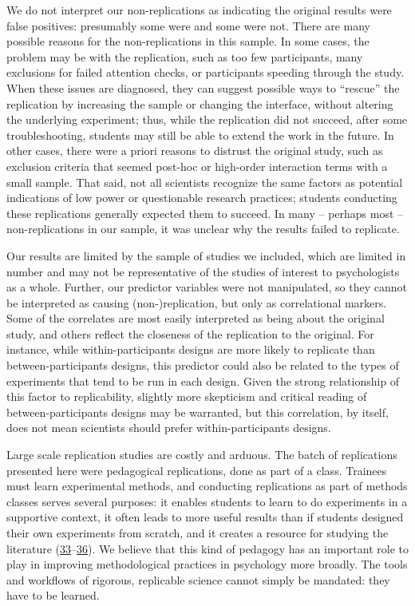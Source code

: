 \documentclass[
  english,
  a4paper,
]{article}
\begin{document}
We do not interpret our non-replications as indicating the original results were false positives: presumably some were and some were not. There are many possible reasons for the non-replications in this sample. In some cases, the problem may be with the replication, such as too few participants, many exclusions for failed attention checks, or participants speeding through the study. When these issues are diagnosed, they can suggest possible ways to ``rescue'' the replication by increasing the sample or changing the interface, without altering the underlying experiment; thus, while the replication did not succeed, after some troubleshooting, students may still be able to extend the work in the future. In other cases, there were a priori reasons to distrust the original study, such as exclusion criteria that seemed post-hoc or high-order interaction terms with a small sample. That said, not all scientists recognize the same factors as potential indications of low power or questionable research practices; students conducting these replications generally expected them to succeed. In many -- perhaps most -- non-replications in our sample, it was unclear why the results failed to replicate.

Our results are limited by the sample of studies we included, which are limited in number and may not be representative of the studies of interest to psychologists as a whole. Further, our predictor variables were not manipulated, so they cannot be interpreted as causing (non-)replication, but only as correlational markers. Some of the correlates are most easily interpreted as being about the original study, and others reflect the closeness of the replication to the original. For instance, while within-participants designs are more likely to replicate than between-participants designs, this predictor could also be related to the types of experiments that tend to be run in each design. Given the strong relationship of this factor to replicability, slightly more skepticism and critical reading of between-participants designs may be warranted, but this correlation, by itself, does not mean scientists should prefer within-participants designs.

Large scale replication studies are costly and arduous. The batch of replications presented here were pedagogical replications, done as part of a class. Trainees must learn experimental methods, and conducting replications as part of methods classes serves several purposes: it enables students to learn to do experiments in a supportive context, it often leads to more useful results than if students designed their own experiments from scratch, and it creates a resource for studying the literature (\protect\hyperlink{ref-quintana2021}{33}--\protect\hyperlink{ref-hawkins2018}{36}). We believe that this kind of pedagogy has an important role to play in improving methodological practices in psychology more broadly. The tools and workflows of rigorous, replicable science cannot simply be mandated: they have to be learned.
\end{document}
